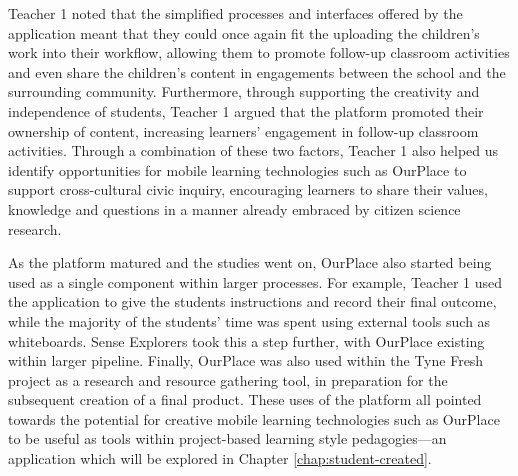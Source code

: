 Teacher 1 noted that the simplified processes and interfaces offered by the application meant that they could once again fit the uploading the children’s work into their workflow, allowing them to promote follow-up classroom activities and even share the children's content in engagements between the school and the surrounding community. Furthermore, through supporting the creativity and independence of students, Teacher 1 argued that the platform promoted their ownership of content, increasing learners’ engagement in follow-up classroom activities. Through a combination of these two factors, Teacher 1 also helped us identify opportunities for mobile learning technologies such as OurPlace to support cross-cultural civic inquiry, encouraging learners to share their values, knowledge and questions in a manner already embraced by citizen science research.

As the platform matured and the studies went on, OurPlace also started being used as a single component within larger processes. For example, Teacher 1 used the application to give the students instructions and record their final outcome, while the majority of the students’ time was spent using external tools such as whiteboards. Sense Explorers took this a step further, with OurPlace existing within larger pipeline. Finally, OurPlace was also used within the Tyne Fresh project as a research and resource gathering tool, in preparation for the subsequent creation of a final product. These uses of the platform all pointed towards the potential for creative mobile learning technologies such as OurPlace to be useful as tools within project-based learning style pedagogies---an application which will be explored in Chapter \ref{chap:student-created}.